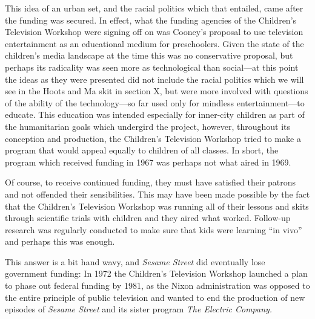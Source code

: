 \documentclass[12pt,letterpaper]{article}
\newcommand{\ses}{\textit{Sesame Street }}
\begin{document}
	This idea of an urban set, and the racial politics which that 
	entailed, came after the funding was secured. In effect, what the 
	funding agencies of the Children’s Television Workshop were signing off
	on was Cooney’s proposal to use television entertainment as an 
	educational medium for preschoolers. Given the state of the children’s 
	media landscape at the time \autocite[chapters 1, 3, and 4]{Davis} this 
	was no conservative proposal, but perhaps its radicality was seen more 
	as technological than social---at this point the ideas as they were 
	presented did not include the racial politics which we will see in 
	the Hoots and Ma skit in section X, but were more involved with 
	questions of the ability of the technology---so far used only for 
	mindless entertainment---to educate. This education was intended 
	especially for inner-city children as part of the humanitarian goals 
	which undergird the project, however, throughout its conception and 
	production, the Children's Television Workshop tried to make a program 
	that would appeal equally to children of all classes. In short, the 
	program which received funding in 1967 was perhaps not what aired in 
	1969.

	Of course, to receive continued funding, they must have satisfied their 
	patrons and not offended their sensibilities. This may have been made 
	possible by the fact that the Children's Television Workshop  was
	running all of their lessons and skits through scientific trials with 
	children and they aired what worked. Follow-up research was regularly 
	conducted to make sure that kids were learning ``in 
	vivo''\autocite[118]{Davis} and perhaps	this was enough.

	This answer is a bit hand wavy, and \ses did eventually lose government
	funding: In 1972 the Children's Television Workshop launched a plan to 
	phase out federal funding by 1981, as the Nixon administration was 
	opposed to the entire principle of public television and wanted to end 
	the production of new episodes of \ses and its sister program
	\textit{The Electric Company.}\autocite[218]{Davis} 
\end{document}
